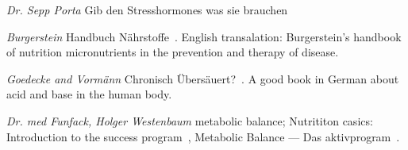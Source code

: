 \documentclass[../main.tex]{subfiles}
\begin{document}
\textit{Dr. Sepp Porta} Gib den Stresshormones was sie brauchen~\cite{PortaStress}

\vspace{5mm}
\noindent\textit{Burgerstein} Handbuch N\"ahrstoffe~\cite{BurgerNutrient}. English transalation:
Burgerstein’s handbook of nutrition micronutrients in the prevention and therapy of disease\cite{BurgerNutE}.

\vspace{5mm}
\noindent\textit{Goedecke and Vorm\"ann} Chronisch \"Ubers\"auert?~\cite{OverAcid}.
A good book in German about acid and base in the human body. 

\vspace{5mm}
\noindent\textit{Dr. med Funfack, Holger Westenbaum} metabolic balance; Nutrititon casics: Introduction to the success program~\cite{MetBalE}, 
Metabolic Balance --- Das aktivprogram~\cite{MetBalD}.
\end{document}
